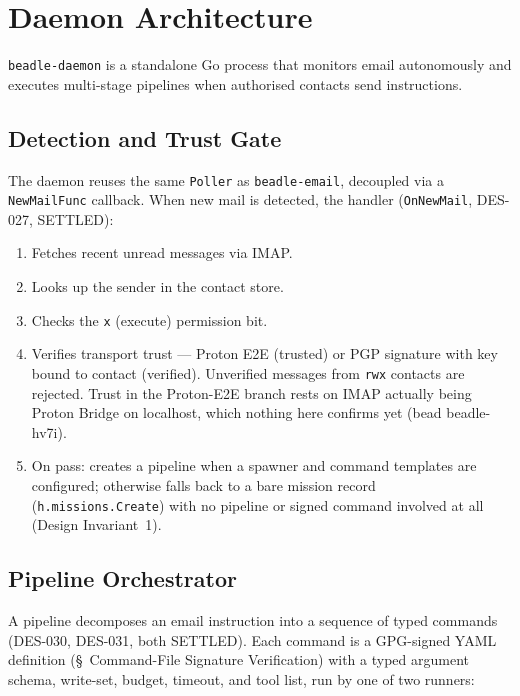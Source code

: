 \documentclass[a4paper,10pt,fleqn]{article}
\begin{document}
\section{Daemon Architecture}

\texttt{beadle-daemon} is a standalone Go process that monitors email
autonomously and executes multi-stage pipelines when authorised
contacts send instructions.

\subsection{Detection and Trust Gate}

The daemon reuses the same \texttt{Poller} as \texttt{beadle-email},
decoupled via a \texttt{NewMailFunc} callback.  When new mail is
detected, the handler (\texttt{OnNewMail}, DES-027, SETTLED):

\begin{enumerate}
  \item Fetches recent unread messages via IMAP.
  \item Looks up the sender in the contact store.
  \item Checks the \texttt{x} (execute) permission bit.
  \item Verifies transport trust --- Proton E2E (trusted) or PGP
    signature with key bound to contact (verified).  Unverified
    messages from \texttt{rwx} contacts are rejected.  Trust in the
    Proton-E2E branch rests on IMAP actually being Proton Bridge on
    localhost, which nothing here confirms yet (bead beadle-hv7i).
  \item On pass: creates a pipeline when a spawner and command
    templates are configured; otherwise falls back to a bare mission
    record (\texttt{h.missions.Create}) with no pipeline or signed
    command involved at all (Design Invariant~1).
\end{enumerate}

\subsection{Pipeline Orchestrator}

A pipeline decomposes an email instruction into a sequence of typed
commands (DES-030, DES-031, both SETTLED).  Each command is a
GPG-signed YAML definition (\S~Command-File Signature Verification)
with a typed argument schema, write-set, budget, timeout, and tool
list, run by one of two runners:
\end{document}
